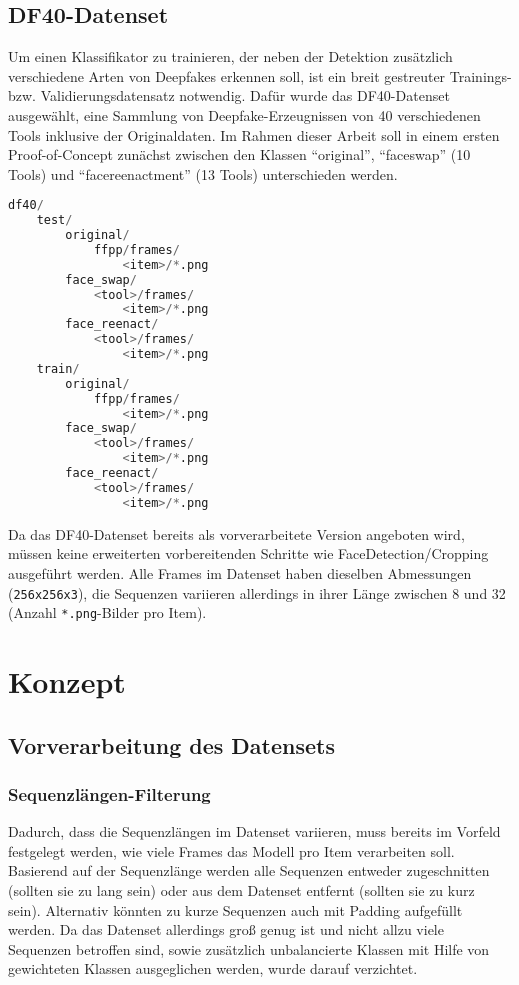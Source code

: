 \documentclass{article}
\begin{document}
    \subsection{DF40-Datenset}
    Um einen Klassifikator zu trainieren, der neben der Detektion zusätzlich verschiedene Arten von Deepfakes erkennen soll, ist ein breit gestreuter Trainings- bzw. Validierungsdatensatz notwendig.
    Dafür wurde das DF40-Datenset~\cite{yan2024df40} ausgewählt, eine Sammlung von Deepfake-Erzeugnissen von 40 verschiedenen Tools inklusive der Originaldaten.
    Im Rahmen dieser Arbeit soll in einem ersten Proof-of-Concept zunächst zwischen den Klassen \enquote{original}, \enquote{faceswap} (10 Tools) und \enquote{facereenactment} (13 Tools) unterschieden werden.
    \begin{lstlisting}[language=Python,caption={Ordnerstruktur des DF40-Datensets im \enquote{io}-Verzeichnis}]
df40/
    test/
        original/
            ffpp/frames/
                <item>/*.png
        face_swap/
            <tool>/frames/
                <item>/*.png
        face_reenact/
            <tool>/frames/
                <item>/*.png
    train/
        original/
            ffpp/frames/
                <item>/*.png
        face_swap/
            <tool>/frames/
                <item>/*.png
        face_reenact/
            <tool>/frames/
                <item>/*.png
    \end{lstlisting}
    Da das DF40-Datenset bereits als vorverarbeitete Version angeboten wird, müssen keine erweiterten vorbereitenden Schritte wie FaceDetection/Cropping ausgeführt werden.
    Alle Frames im Datenset haben dieselben Abmessungen (\texttt{256x256x3}), die Sequenzen variieren allerdings in ihrer Länge zwischen 8 und 32 (Anzahl \texttt{*.png}-Bilder pro Item).

    \section{Konzept}
    \subsection{Vorverarbeitung des Datensets}
    \subsubsection{Sequenzlängen-Filterung}
    Dadurch, dass die Sequenzlängen im Datenset variieren, muss bereits im Vorfeld festgelegt werden, wie viele Frames das Modell pro Item verarbeiten soll.
    Basierend auf der Sequenzlänge werden alle Sequenzen entweder zugeschnitten (sollten sie zu lang sein) oder aus dem Datenset entfernt (sollten sie zu kurz sein).
    Alternativ könnten zu kurze Sequenzen auch mit Padding aufgefüllt werden.
    Da das Datenset allerdings groß genug ist und nicht allzu viele Sequenzen betroffen sind, sowie zusätzlich unbalancierte Klassen mit Hilfe von gewichteten Klassen ausgeglichen werden, wurde darauf verzichtet.
\end{document}
